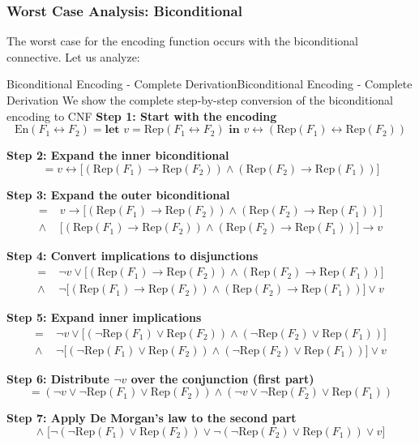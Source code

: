 \documentclass[a4paper]{article}
\newcommand{\Rep}{\mathrm{Rep}}
\newcommand{\En}{\mathrm{En}}
\theoremstyle{definition}
\begin{document}
\subsubsection{Worst Case Analysis: Biconditional}
The worst case for the encoding function occurs with the biconditional connective. Let us analyze:
\begin{example}{Biconditional Encoding - Complete Derivation}{Biconditional Encoding - Complete Derivation}
We show the complete step-by-step conversion of the biconditional encoding to CNF
\noindent\textbf{Step 1: Start with the encoding}
\[
\En(F_1 \leftrightarrow F_2) = \textbf{let } v = \Rep(F_1 \leftrightarrow F_2) \textbf{ in } v \leftrightarrow (\Rep(F_1) \leftrightarrow \Rep(F_2))
\]

\noindent\textbf{Step 2: Expand the inner biconditional}
\[
= v \leftrightarrow \big[(\Rep(F_1) \to \Rep(F_2)) \land (\Rep(F_2) \to \Rep(F_1))\big]
\]

\noindent\textbf{Step 3: Expand the outer biconditional}
\begin{align*}
= \;& v \to \big[(\Rep(F_1) \to \Rep(F_2)) \land (\Rep(F_2) \to \Rep(F_1))\big] \\
\land\; & \big[(\Rep(F_1) \to \Rep(F_2)) \land (\Rep(F_2) \to \Rep(F_1))\big] \to v
\end{align*}

\noindent\textbf{Step 4: Convert implications to disjunctions}
\begin{align*}
= \;& \neg v \lor \big[(\Rep(F_1) \to \Rep(F_2)) \land (\Rep(F_2) \to \Rep(F_1))\big] \\
\land\; & \neg\big[(\Rep(F_1) \to \Rep(F_2)) \land (\Rep(F_2) \to \Rep(F_1))\big] \lor v
\end{align*}

\noindent\textbf{Step 5: Expand inner implications}
\begin{align*}
= \;& \neg v \lor \big[(\neg\Rep(F_1) \lor \Rep(F_2)) \land (\neg\Rep(F_2) \lor \Rep(F_1))\big] \\
\land\; & \neg\big[(\neg\Rep(F_1) \lor \Rep(F_2)) \land (\neg\Rep(F_2) \lor \Rep(F_1))\big] \lor v
\end{align*}

\noindent\textbf{Step 6: Distribute $\neg v$ over the conjunction (first part)}
\[
= (\neg v \lor \neg\Rep(F_1) \lor \Rep(F_2)) \land (\neg v \lor \neg\Rep(F_2) \lor \Rep(F_1))
\]

\noindent\textbf{Step 7: Apply De Morgan's law to the second part}
\[
\land\; \big[\neg(\neg\Rep(F_1) \lor \Rep(F_2)) \lor \neg(\neg\Rep(F_2) \lor \Rep(F_1)) \lor v\big]
\]


\end{example}
\end{document}
